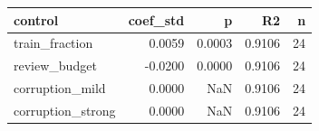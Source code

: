 \begin{tabular}{lrrrr}
\toprule
          control &  coef\_std &      p &     R2 &  n \\
\midrule
   train\_fraction &    0.0059 & 0.0003 & 0.9106 & 24 \\
    review\_budget &   -0.0200 & 0.0000 & 0.9106 & 24 \\
  corruption\_mild &    0.0000 &    NaN & 0.9106 & 24 \\
corruption\_strong &    0.0000 &    NaN & 0.9106 & 24 \\
\bottomrule
\end{tabular}

